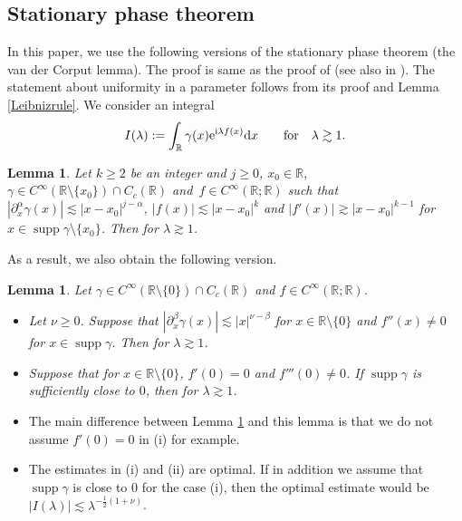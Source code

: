 \documentclass[10pt,a4paper]{amsart}
\numberwithin{equation}{section}
\newtheorem{Lemma}[Theorem]{Lemma}
\def\R{\mathbb{R}}%
\DeclareMathOperator{\supp}{supp}%
\def\a{\alpha}
\def\b{\beta}
\def\c{\gamma}
\def\l{\lambda}
\def\n{\nu}
\def\pa{\partial}
\begin{document}
\subsection{Stationary phase theorem}

In this paper, we use the following versions of the stationary phase theorem (the van der Corput lemma). The proof is same as the proof of \cite[Lemma 1.1.2]{So} (see also in \cite[p.~334]{S}). The statement about uniformity in a parameter follows from its proof and Lemma \ref{Leibnizrule}. We consider an integral
\begin{align*}
I(\l):=\int_{\R}\c(x){\rm e}^{{\rm i}\l f(x)}{\rm d}x\qquad \text{for}\quad \l\gtrsim 1.
\end{align*}

\begin{Lemma}\label{stphaselem}
Let $k\geq 2$ be an integer and $j\geq 0$, $x_0\in \R$, $\c\in C^{\infty}(\R\setminus \{x_0\})\cap C_c(\R)$ and~${f\in C^{\infty}(\R;\R)}$ such that $|\pa_x^{\a}\c(x)|\lesssim |x-x_0|^{j-\a}$, $|f(x)|\lesssim |x-x_0|^k$ and $|f'(x)|\gtrsim |x-x_0|^{k-1}$ for $x\in \supp \c\setminus \{x_0\}$.
Then \smash{$|I(\l)|\lesssim \l^{-\frac{j+1}{k}}$} for $\l\gtrsim 1$.
\end{Lemma}

As a result, we also obtain the following version.

\begin{Lemma}\label{stphaselem2}
Let $\c\in C^{\infty}(\R\setminus \{0\})\cap C_c(\R)$ and $f\in C^{\infty}(\R;\R)$.
\begin{itemize}\itemsep=0pt
\item[$(i)$] Let $\n\geq 0$. Suppose that $|\pa_x^{\b}\c(x)|\lesssim |x|^{\n-\b}$ for $x\in \R\setminus\{0\}$ and $f''(x)\neq 0$ for $x\in \supp \c$. Then \smash{$|I(\l)|\lesssim \l^{-\frac{1}{2}}$} for $\l\gtrsim 1$.

\item[$(ii)$] Suppose that \smash{$\big|\pa_x^{\b}\c(x)\big|\lesssim |x|^{\frac{1}{2}-\b}$} for $x\in \R\setminus\{0\}$, $f'(0)=0$ and $f'''(0)\neq 0$. If $\supp \c$ is sufficiently close to $0$, then \smash{$|I(\l)|\lesssim \l^{-\frac{1}{2}}$} for $\l\gtrsim 1$.
\end{itemize}
\end{Lemma}

\begin{Remark}\quad
\begin{itemize}\itemsep=0pt
\item[(1)] The main difference between Lemma \ref{stphaselem} and this lemma is that we do not assume $f'(0)=0$ in (i) for example.
\item[(2)] The estimates in (i) and (ii) are optimal. If in addition we assume that $\supp \c$ is close to $0$ for the case (i), then the optimal estimate would be $|I(\l)|\lesssim \l^{-\frac{1}{2}(1+\n)}$.
 \end{itemize}
\end{Remark}
\end{document}
